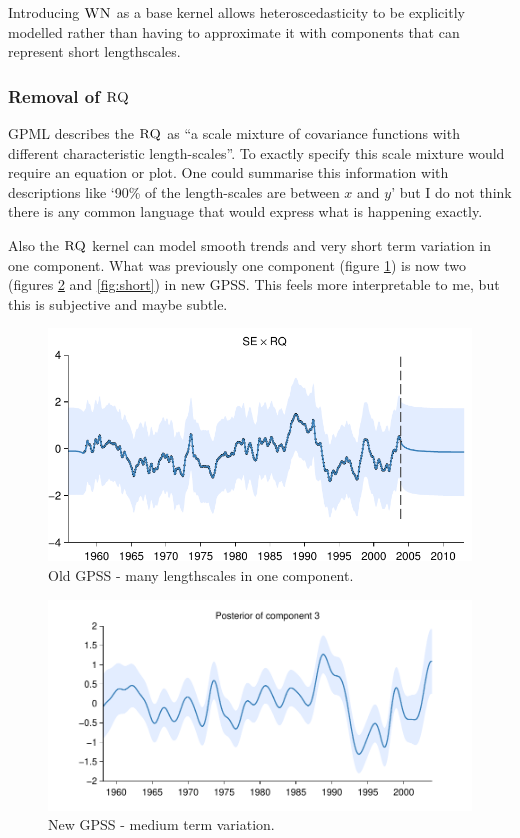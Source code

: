 \documentclass{article}
\begin{document}
Introducing ${\textsc{WN}}$ as a base kernel allows heteroscedasticity to be explicitly modelled rather than having to approximate it with components that can represent short lengthscales.

\subsubsection{Removal of ${\textsc{RQ}}$}

GPML describes the ${\textsc{RQ}}$ as ``a scale mixture of \kSE covariance functions with different characteristic length-scales''.
To exactly specify this scale mixture would require an equation or plot.
One could summarise this information with descriptions like `90\% of the length-scales are between $x$ and $y$' but I do not think there is any common language that would express what is happening exactly.

Also the ${\textsc{RQ}}$ kernel can model smooth trends and very short term variation in one component.
What was previously one component (figure \ref{fig:RQ}) is now two (figures \ref{fig:medium} and \ref{fig:short}) in new GPSS.
This feels more interpretable to me, but this is subjective and maybe subtle.

\begin{figure}[h]
\centering
\includegraphics[width=0.98\columnwidth]{figures/old-gpss/03-mauna2003-s_3}
\caption{Old GPSS - many lengthscales in one component.}
\label{fig:RQ}
\end{figure}

\begin{figure}[h]
\centering
\includegraphics[width=0.98\columnwidth]{figures/03-mauna/03-mauna_3}
\caption{New GPSS - medium term variation.}
\label{fig:medium}
\end{figure}
\end{document}
